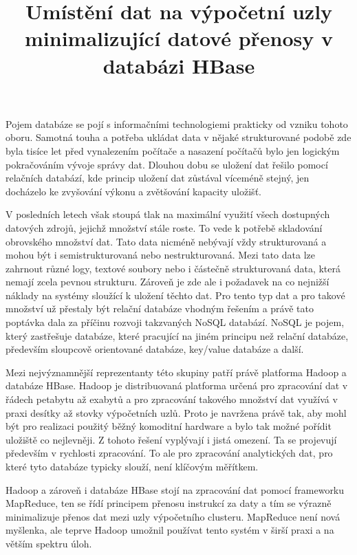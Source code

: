 \documentclass[thesis=M,czech]{FITthesis}[2012/06/26]
\title{Umístění dat na výpočetní uzly minimalizující datové přenosy v databázi HBase}
\begin{document}
\lstset{language=sh}  

\begin{introduction}
Pojem databáze se pojí s informačními technologiemi prakticky od vzniku tohoto oboru. Samotná touha a potřeba ukládat data v nějaké strukturované podobě zde byla tisíce let před vynalezením počítače a nasazení počítačů bylo jen logickým pokračováním vývoje správy dat. Dlouhou dobu se uložení dat řešilo pomocí relačních databází, kde princip uložení dat zůstával víceméně stejný, jen docházelo ke zvyšování výkonu a zvětšování kapacity uložišť.

 V posledních letech však stoupá tlak na maximální využití všech dostupných datových zdrojů, jejichž množství stále roste. To vede k potřebě skladování obrovského množství dat. Tato data nicméně nebývají vždy strukturovaná a mohou být i semistrukturovaná nebo nestrukturovaná. Mezi tato data lze zahrnout různé logy, textové soubory nebo i částečně strukturovaná data, která nemají zcela pevnou strukturu. Zároveň je zde ale i požadavek na co nejnižší náklady na systémy sloužící k uložení těchto dat. Pro tento typ dat a pro takové množství už přestaly být relační databáze vhodným řešením a právě tato poptávka dala za příčinu rozvoji takzvaných NoSQL databází. NoSQL je pojem, který zastřešuje databáze, které pracující na jiném principu než relační databáze, především sloupcově orientované databáze, key/value databáze a další. 
 
 
Mezi nejvýznamnější reprezentanty této skupiny patří právě platforma Hadoop a databáze HBase. Hadoop je distribuovaná platforma určená pro zpracování dat v řádech petabytu až exabytů a pro zpracování takového množství dat využívá v praxi desítky až stovky výpočetních uzlů. Proto je navržena právě tak, aby mohl být pro realizaci použitý běžný komoditní hardware a bylo tak možné pořídit uložiště co nejlevněji. Z tohoto řešení vyplývají i jistá omezení. Ta se projevují především v rychlosti zpracování. To ale pro zpracování analytických dat, pro které tyto databáze typicky slouží, není klíčovým měřítkem.


Hadoop a zároveň i databáze HBase stojí na zpracování dat pomocí frameworku MapReduce, ten se řídí principem přenosu instrukcí za daty a tím se výrazně minimalizuje přenos dat mezi uzly výpočetního clusteru. MapReduce není nová myšlenka, ale teprve Hadoop umožnil používat tento systém v širší praxi a na větším spektru úloh.



\end{introduction}
\end{document}
